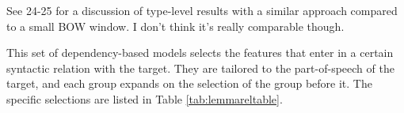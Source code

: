 \documentclass[
]{book}
\providecommand{\tightlist}{%
  \setlength{\itemsep}{0pt}\setlength{\parskip}{0pt}}
\begin{document}
See \textcite{kiela.clark_2014} 24-25 for a discussion of type-level results with a similar approach compared to a small BOW window. I don't think it's really comparable though.

\begin{description}
\tightlist
\item[\texttt{LEMMAREL}]
This set of dependency-based models selects the features that enter in a certain
syntactic relation with the target. They are tailored to the part-of-speech of the target,
and each group expands on the selection of the group before it. The specific selections
are listed in Table \ref{tab:lemmareltable}.
\end{description}

\providecommand{\docline}[3]{\noalign{\global\setlength{\arrayrulewidth}{#1}}\arrayrulecolor[HTML]{#2}\cline{#3}}

\setlength{\tabcolsep}{2pt}

\renewcommand*{\arraystretch}{1.5}
\end{document}
